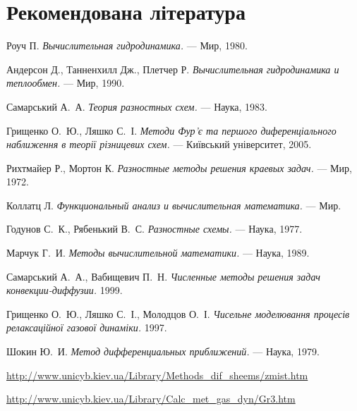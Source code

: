 \section{Рекомендована література}
\begin{enumerate}[label={[\arabic*]}]
    \item Роуч П. \textit{Вычислительная гидродинамика.} --- Мир, 1980.
    \item Андерсон Д., Танненхилл Дж., Плетчер Р. \textit{Вычислительная гидродинамика и теплообмен.} --- Мир, 1990.
    \item Самарський А.~А. \textit{Теория разностных схем.} --- Наука, 1983.
    \item Грищенко О.~Ю., Ляшко С.~І. \textit{Методи Фур'є та першого диференціального наближення в теорії різницевих схем.} --- Київський університет, 2005.
    \item Рихтмайер Р., Мортон К. \textit{Разностные методы решения краевых задач.} --- Мир, 1972.
    \item Коллатц Л. \textit{Функциональный анализ и вычислительная математика.} --- Мир. 
    \item Годунов С.~К., Рябенький В.~С. \textit{Разностные схемы.} --- Наука, 1977.
    \item Марчук Г.~И. \textit{Методы вычислительной математики.} --- Наука, 1989.
    \item Самарський А.~А., Вабищевич П.~Н. \textit{Численные методы решения задач конвекции-диффузии.} 1999.
    \item Грищенко О.~Ю., Ляшко С.~І., Молодцов О.~І. \textit{Чисельне моделювання процесів релаксаційної газової динаміки.} 1997.
    \item Шокин Ю.~И. \textit{Метод дифференциальных приближений.} --- Наука, 1979.
    \item \url{http://www.unicyb.kiev.ua/Library/Methods_dif_sheems/zmist.htm}
    \item \url{http://www.unicyb.kiev.ua/Library/Calc_met_gas_dyn/Gr3.htm}
\end{enumerate}
